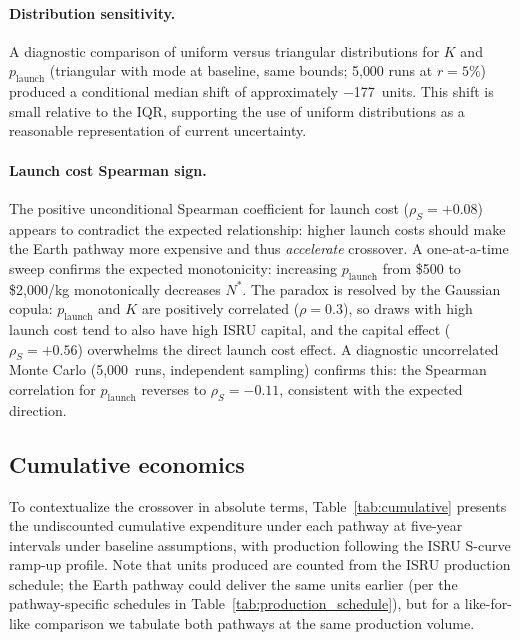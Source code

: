 \documentclass[preprint,12pt]{elsarticle}
\begin{document}
\paragraph{Distribution sensitivity.} A diagnostic comparison of uniform versus triangular distributions for $K$ and $p_{\mathrm{launch}}$ (triangular with mode at baseline, same bounds; 5{,}000 runs at $r = 5\%$) produced a conditional median shift of approximately $-$177~units. This shift is small relative to the IQR, supporting the use of uniform distributions as a reasonable representation of current uncertainty.

\paragraph{Launch cost Spearman sign.} The positive unconditional Spearman coefficient for launch cost ($\rho_S = +0.08$) appears to contradict the expected relationship: higher launch costs should make the Earth pathway more expensive and thus \emph{accelerate} crossover. A one-at-a-time sweep confirms the expected monotonicity: increasing $p_{\mathrm{launch}}$ from \$500 to \$2{,}000/kg monotonically decreases $N^*$. The paradox is resolved by the Gaussian copula: $p_{\mathrm{launch}}$ and $K$ are positively correlated ($\rho = 0.3$), so draws with high launch cost tend to also have high ISRU capital, and the capital effect ($\rho_S = +0.56$) overwhelms the direct launch cost effect. A diagnostic uncorrelated Monte Carlo (5{,}000~runs, independent sampling) confirms this: the Spearman correlation for $p_{\mathrm{launch}}$ reverses to $\rho_S = -0.11$, consistent with the expected direction.

\subsection{Cumulative economics}

To contextualize the crossover in absolute terms, Table~\ref{tab:cumulative} presents the undiscounted cumulative expenditure under each pathway at five-year intervals under baseline assumptions, with production following the ISRU S-curve ramp-up profile. Note that units produced are counted from the ISRU production schedule; the Earth pathway could deliver the same units earlier (per the pathway-specific schedules in Table~\ref{tab:production_schedule}), but for a like-for-like comparison we tabulate both pathways at the same production volume.
\end{document}
